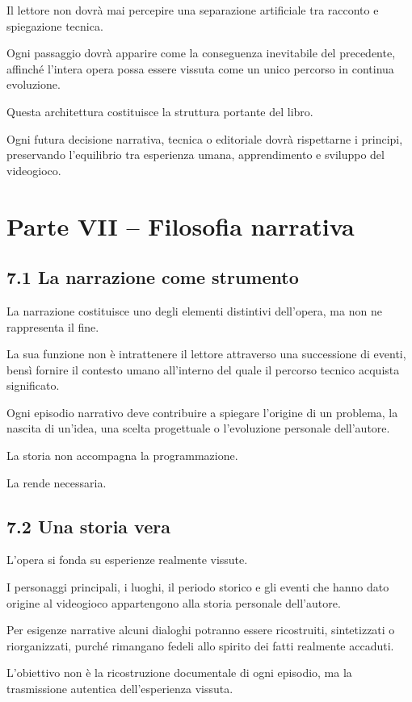 \documentclass{article}
\begin{document}
Il lettore non dovrà mai percepire una separazione artificiale tra racconto e spiegazione tecnica.

Ogni passaggio dovrà apparire come la conseguenza inevitabile del precedente, affinché l'intera opera possa essere
vissuta come un unico percorso in continua evoluzione.

Questa architettura costituisce la struttura portante del libro.

Ogni futura decisione narrativa, tecnica o editoriale dovrà rispettarne i principi, preservando l'equilibrio tra
esperienza umana, apprendimento e sviluppo del videogioco.

\section{Parte VII – Filosofia narrativa}
\subsection{7.1 La narrazione come strumento}
La narrazione costituisce uno degli elementi distintivi dell'opera, ma non ne rappresenta il fine.

La sua funzione non è intrattenere il lettore attraverso una successione di eventi, bensì fornire il contesto umano
all'interno del quale il percorso tecnico acquista significato.

Ogni episodio narrativo deve contribuire a spiegare l'origine di un problema, la nascita di un'idea, una scelta
progettuale o l'evoluzione personale dell'autore.

La storia non accompagna la programmazione.

La rende necessaria.

\subsection{7.2 Una storia vera}
L'opera si fonda su esperienze realmente vissute.

I personaggi principali, i luoghi, il periodo storico e gli eventi che hanno dato origine al videogioco appartengono
alla storia personale dell'autore.

Per esigenze narrative alcuni dialoghi potranno essere ricostruiti, sintetizzati o riorganizzati, purché rimangano
fedeli allo spirito dei fatti realmente accaduti.

L'obiettivo non è la ricostruzione documentale di ogni episodio, ma la trasmissione autentica dell'esperienza vissuta.
\end{document}
